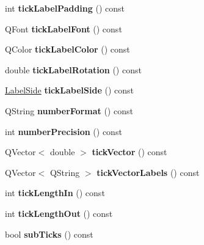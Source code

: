 \begin{DoxyCompactItemize}
int {\bfseries tick\+Label\+Padding} () const
\item 
\mbox{\label{class_q_c_p_axis_a09f339b7125cf1094920f86687b88236}} 
Q\+Font {\bfseries tick\+Label\+Font} () const
\item 
\mbox{\label{class_q_c_p_axis_a9e21b2326bb2de0b7a8efcd1efc0ce78}} 
Q\+Color {\bfseries tick\+Label\+Color} () const
\item 
\mbox{\label{class_q_c_p_axis_a5c81e5d550266fdb9e11d96d1dc5713e}} 
double {\bfseries tick\+Label\+Rotation} () const
\item 
\mbox{\label{class_q_c_p_axis_a1dc21783965a7c7d9c29c2a75d0a54e1}} 
\hyperlink{class_q_c_p_axis_a24b13374b9b8f75f47eed2ea78c37db9}{Label\+Side} {\bfseries tick\+Label\+Side} () const
\item 
\mbox{\label{class_q_c_p_axis_a20cc29c2f282a0e9efd8f32145e47be6}} 
Q\+String {\bfseries number\+Format} () const
\item 
\mbox{\label{class_q_c_p_axis_a2562b6f3a4a01c7ed83a388042664998}} 
int {\bfseries number\+Precision} () const
\item 
\mbox{\label{class_q_c_p_axis_a5aad9d6b34821ab0751dfc38dbc92a46}} 
Q\+Vector$<$ double $>$ {\bfseries tick\+Vector} () const
\item 
\mbox{\label{class_q_c_p_axis_a1bd4a9036e0c9fc68b6f3df81f07e55f}} 
Q\+Vector$<$ Q\+String $>$ {\bfseries tick\+Vector\+Labels} () const
\item 
\mbox{\label{class_q_c_p_axis_ace2accb350fd3f3f474280f58c1d61c5}} 
int {\bfseries tick\+Length\+In} () const
\item 
\mbox{\label{class_q_c_p_axis_ad3ba6614ccddf351f133e0acdd4f021e}} 
int {\bfseries tick\+Length\+Out} () const
\item 
\mbox{\label{class_q_c_p_axis_ad74153c38fd83b54c509cff249370beb}} 
bool {\bfseries sub\+Ticks} () const

\end{DoxyCompactItemize}

